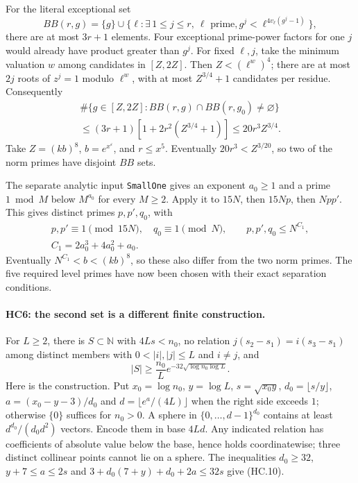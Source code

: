 For the literal exceptional set
\[
 BB(r,g)=\{g\}\cup
 \{\ell:\exists\,1\le j\le r,\ \ell\text{ prime},
                      g^j<\ell^{4v_\ell(g^j-1)}\},
\]
there are at most $3r+1$ elements. Four exceptional prime-power
factors for one $j$ would already have product greater than $g^j$.
For fixed $\ell,j$, take the minimum valuation $w$ among candidates
in $[Z,2Z]$. Then $Z<(\ell^w)^4$; there are at most $2j$
roots of $z^j=1$ modulo $\ell^w$, with at most
$Z^{3/4}+1$ candidates per residue. Consequently
\[
 \begin{gathered}
 \#\{g\in[Z,2Z]:BB(r,g)\cap BB(r,g_0)\ne\varnothing\}
 \\
 \le(3r+1)[1+2r^2(Z^{3/4}+1)]\le20r^3Z^{3/4}.
 \end{gathered}                                      \tag{HC.8}
\]
Take $Z=(kb)^8$, $b=e^{x^\varepsilon}$, and $r\le x^5$.
Eventually $20r^3<Z^{3/20}$, so two of the norm primes have
disjoint $BB$ sets.

The separate analytic input \texttt{SmallOne} gives an exponent
$a_0\ge1$ and a prime $1\bmod M$ below $M^{a_0}$ for every
$M\ge2$. Apply it to $15N$, then $15Np$, then $Npp'$.
This gives distinct primes $p,p',q_0$, with
\[
 \begin{gathered}
 p,p'\equiv1\pmod{15N},\quad q_0\equiv1\pmod N,\qquad
 p,p',q_0\le N^{C_1},\\
 C_1=2a_0^3+4a_0^2+a_0.
 \end{gathered}                                      \tag{HC.9}
\]
Eventually $N^{C_1}<b<(kb)^8$, so these also differ from the
two norm primes. The five required level primes have now been
chosen with their exact separation conditions.

\paragraph{HC6: the second set is a different finite construction.}
For $L\ge2$, there is $S\subset\mathbb N$ with $4Ls<n_0$,
no relation
$j(s_2-s_1)=i(s_3-s_1)$ among distinct members with
$0<|i|,|j|\le L$ and $i\ne j$, and
\[
 |S|\ge \frac{n_0}{L}
             e^{-32\sqrt{\log n_0\log L}}.           \tag{HC.10}
\]
Here is the construction. Put $x_0=\log n_0$, $y=\log L$,
$s=\sqrt{x_0y}$, $d_0=\lfloor s/y\rfloor$,
$a=(x_0-y-3)/d_0$ and
$d=\lfloor e^a/(4L)\rfloor$ when the right side exceeds $1$;
otherwise $\{0\}$ suffices for $n_0>0$.
A sphere in $\{0,\ldots,d-1\}^{d_0}$ contains at least
$d^{d_0}/(d_0d^2)$ vectors. Encode them in base $4Ld$.
Any indicated relation has coefficients of absolute value below
the base, hence holds coordinatewise; three distinct collinear
points cannot lie on a sphere. The inequalities
$d_0\ge32$, $y+7\le a\le2s$ and
$3+d_0(7+y)+d_0+2a\le32s$ give (HC.10).


